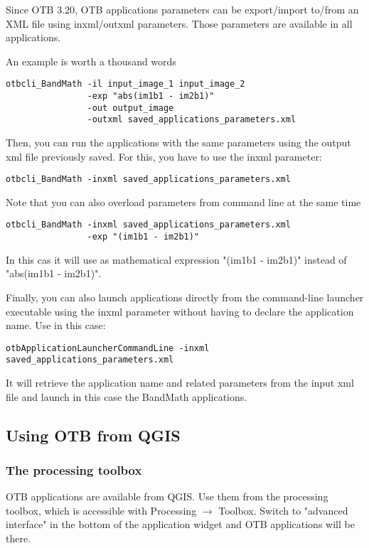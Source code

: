 Since OTB 3.20, OTB applications parameters can be export/import to/from an XML
file using inxml/outxml parameters. Those parameters are available in all
applications.

An example is worth a thousand words

\begin{verbatim}
otbcli_BandMath -il input_image_1 input_image_2
                -exp "abs(im1b1 - im2b1)"
                -out output_image
                -outxml saved_applications_parameters.xml
\end{verbatim}

Then, you can run the applications with the same parameters using the output xml
file previously saved. For this, you have to use the inxml parameter:

\begin{verbatim}
otbcli_BandMath -inxml saved_applications_parameters.xml
\end{verbatim}

Note that you can also overload parameters from command line at the same time

\begin{verbatim}
otbcli_BandMath -inxml saved_applications_parameters.xml
                -exp "(im1b1 - im2b1)"
\end{verbatim}

In this cas it will use as mathematical expression "(im1b1 - im2b1)" instead
of "abs(im1b1 - im2b1)".

Finally, you can also launch applications directly from the command-line launcher executable using
the inxml parameter without having to declare the application name. Use in this case:

\begin{verbatim}
otbApplicationLauncherCommandLine -inxml saved_applications_parameters.xml
\end{verbatim}

It will retrieve the application name and related parameters from the input xml
file and launch in this case the BandMath applications.

\subsection{Using OTB from QGIS}
\subsubsection{The processing toolbox}
OTB applications are available from QGIS. Use them from the processing toolbox,
which is accessible with Processing $\rightarrow$ Toolbox. Switch to "advanced interface"
in the bottom of the application widget and OTB applications will be there.

